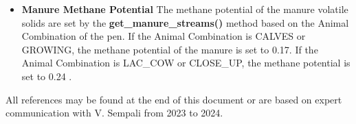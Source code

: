 \documentclass{article}
\begin{document}
\begin{refsection}
\begin{itemize}
            {\raggedleft \textbf{[AN.EXC.33]}\par}
            \vspace{0.5cm}

Manure P excreted by a cow (g/d)
        \vspace{0.5cm}
    
    \begin{center}
        \(manure\_phosphorus\_excreted = fecal\_phosphorus + urine\_phosphorus\_required\)
    \end{center}
        \vspace{0.5cm} 
    
            {\raggedleft \textbf{[AN.EXC.34]}\par}
            \vspace{0.5cm}

Total P excreted by a cow (g/d)
        \vspace{0.5cm}
    
    \begin{center}
        \(total\_phosphorus\_excreted = phosphorus\_in\_milk + fecal\_phosphorus  + urine\_phosphorus\_required\)
    \end{center}
        \vspace{0.5cm} 
    
            {\raggedleft \textbf{[AN.EXC.35]}\par}
            \vspace{0.5cm}


\item \textbf{Manure Methane Potential}
  The methane potential of the manure volatile solids are set by the \textbf{get\_manure\_streams()} method based on the Animal Combination of the pen. If the Animal Combination is CALVES or GROWING, the methane potential of the manure is set to 0.17. If the Animal Combination is LAC\_COW or CLOSE\_UP, the methane potential is set to 0.24 \parencite{Hanson2024}.
    
    \end{itemize}
 

\begin{tcolorbox}[colback=white, colframe=black, title=Important Note]
All references may be found at the end of this document or are based on expert communication with V. Sempali from 2023 to 2024. 
\end{tcolorbox}
\nocite{reed2015} \nocite{nennich2005}\nocite{asabe2005} \nocite{johnson2016} \nocite{appuhamy2014}\nocite{appuhamy2018}\nocite{vadas2007} \nocite{nrc2001}\nocite{nrc2021}\nocite{wilkerson1997prediction}\nocite{boadi2004}\nocite{deboer2002a}\nocite{monteny2002b}


\end{refsection}
\end{document}
